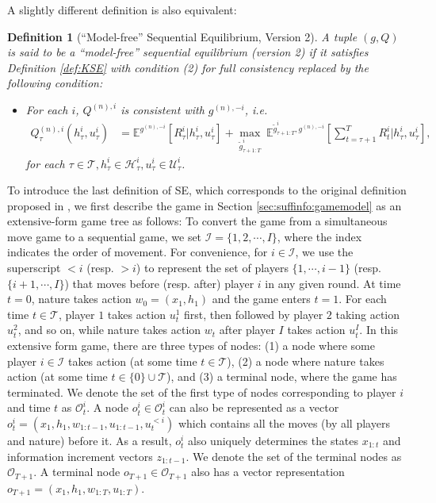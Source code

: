 \documentclass[pdflatex,sn-basic]{sn-jnl}
\newcommand{\E}{\mathbb{E}}
\newcommand{\Qfunc}{Q}
\theoremstyle{thmstyleone}%
\theoremstyle{thmstyletwo}%
\theoremstyle{thmstylethree}%
\newtheorem{defn}{Definition}
\begin{document}
\begin{appendices}
A slightly different definition is also equivalent:
\begin{defn}[``Model-free'' Sequential Equilibrium, Version 2]\label{def:KSE2}
A tuple $(g, \Qfunc)$ is said to be a ``model-free'' sequential equilibrium (version 2) if it satisfies Definition \ref{def:KSE} with condition (2) for full consistency replaced by the following condition:
\begin{itemize}
	\item[(2')] For each $i$, $\Qfunc^{(n), i}$ is consistent with $g^{(n), -i}$, i.e.
	\begin{align*}
		\Qfunc_\tau^{(n), i}(h_\tau^i, u_\tau^i)&=\E^{g^{(n), -i}}[R_\tau^i|h_\tau^i, u_\tau^i] + \underset{\tilde{g}_{\tau+1:T}^i}{\max}~\E^{\tilde{g}_{\tau+1:T}^i, g^{(n), -i}}\left[\sum_{t=\tau+1}^T R_t^i\Big|h_\tau^i, u_\tau^i\right],
	\end{align*}
	for each $\tau\in\mathcal{T}, h_\tau^i\in \mathcal{H}_\tau^i, u_\tau^i\in \mathcal{U}_\tau^i$.
\end{itemize}
\end{defn}

{To introduce the last definition of SE, which corresponds to the original definition proposed in \cite{kreps1982sequential}, we first describe the game in Section \ref{sec:suffinfo:gamemodel} as an extensive-form game tree as follows:} 
To convert the game from a simultaneous move game to a sequential game, we set $\mathcal{I}=\{1, 2, \cdots, I\}$, where the index indicates the order of movement. For convenience, for $i\in\mathcal{I}$, we use the superscript $<i$ (resp. $>i$) to represent the set of players $\{1, \cdots, i-1\}$ (resp. $\{i+1, \cdots, I\}$) that moves before (resp. after) player $i$ in any given round. At time $t=0$, nature takes action $w_0=(x_1, h_1)$ and the game enters $t=1$. For each time $t\in\mathcal{T}$, player $1$ takes action $u_t^1$ first, then followed by player $2$ taking action $u_t^2$, and so on, while nature takes action $w_t$ after player $I$ takes action $u_t^I$. 
{In this extensive form game, there are three types of nodes: (1) a node where some player $i\in\mathcal{I}$ takes action (at some time $t\in\mathcal{T}$), (2) a node where nature takes action (at some time $t\in  \{0\}\cup \mathcal{T}$), and (3) a terminal node, where the game has terminated. We denote the set of the first type of nodes corresponding to player $i$ and time $t$ as $\mathcal{O}_t^i$. A node $o_t^i\in\mathcal{O}_t^i$ can also be represented as a vector $o_t^i = (x_{1}, h_1, w_{1:t-1}, u_{1:t-1}, u_{t}^{<i})$ which contains all the moves (by all players and nature) before it. As a result, $o_t^i$ also uniquely determines the states $x_{1:t}$ and information increment vectors $z_{1:t-1}$. We denote the set of the terminal nodes as $\mathcal{O}_{T+1}$. A terminal node $o_{T+1}\in \mathcal{O}_{T+1}$ also has a vector representation $o_{T+1} = (x_{1}, h_1, w_{1:T}, u_{1:T})$.}


\end{appendices}
\end{document}
